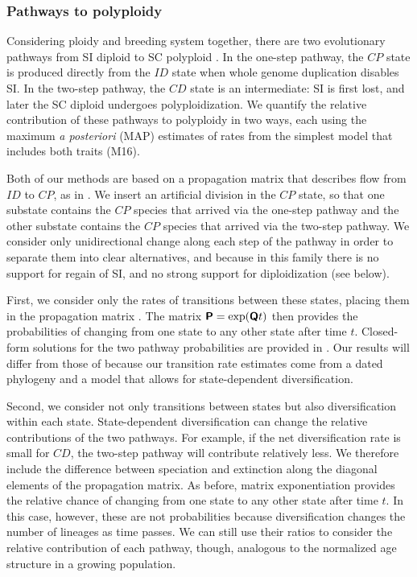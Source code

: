 \subsubsection{Pathways to polyploidy}

Considering ploidy and breeding system together, there are two evolutionary pathways from SI diploid to SC polyploid \citep{brunet2001, robertson_2011}.
In the one-step pathway, the $CP$ state is produced directly from the $ID$ state when whole genome duplication disables SI.
In the two-step pathway, the $CD$ state is an intermediate: SI is first lost, and later the SC diploid undergoes polyploidization.
We quantify the relative contribution of these pathways to polyploidy in two ways, each using the maximum \textit{a posteriori} (MAP) estimates of rates from the simplest model that includes both traits (M16).

Both of our methods are based on a propagation matrix that describes flow from $ID$ to $CP$, as in \citet{robertson_2011}.
We insert an artificial division in the $CP$ state, so that one substate contains the $CP$ species that arrived via the one-step pathway and the other substate contains the $CP$ species that arrived via the two-step pathway.
We consider only unidirectional change along each step of the pathway in order to separate them into clear alternatives, and because in this family there is no support for regain of SI, and no strong support for diploidization (see below).

First, we consider only the rates of transitions between these states, placing them in the propagation matrix .
The matrix $\bm{\mathsf{P}} = \exp(\bm{\mathsf{Q}} t)$ then provides the probabilities of changing from one state to any other state after time $t$.
Closed-form solutions for the two pathway probabilities are provided in \citet{robertson_2011}.
Our results will differ from those of \citet{robertson_2011} because our transition rate estimates come from a dated phylogeny and a model that allows for state-dependent diversification.

Second, we consider not only transitions between states but also diversification within each state.
State-dependent diversification can change the relative contributions of the two pathways.
For example, if the net diversification rate is small for $CD$, the two-step pathway will contribute relatively less.
We therefore include the difference between speciation and extinction along the diagonal elements of the propagation matrix.
As before, matrix exponentiation provides the relative chance of changing from one state to any other state after time $t$.
In this case, however, these are not probabilities because diversification changes the number of lineages as time passes.
We can still use their ratios to consider the relative contribution of each pathway, though, analogous to the normalized age structure in a growing population. %

